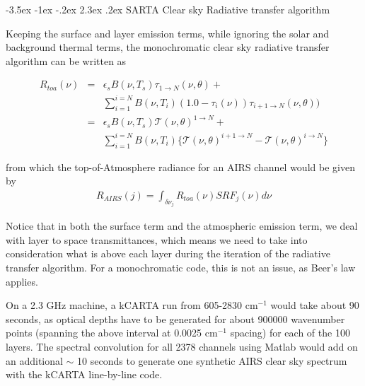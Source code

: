 \documentclass[11pt]{article}
\makeatletter
\newcommand{\kc}{\textsf{kCARTA}\xspace}
\newcommand{\wn}{cm$^{-1}$\xspace}
\renewcommand{\section}{\@startsection {section}{1}{\z@}%
                                   {-3.5ex \@plus -1ex \@minus -.2ex}%
                                   {2.3ex \@plus.2ex}%
                                   {\reset@font\large\bfseries}}
\makeatother
\begin{document}
\section{SARTA Clear sky Radiative transfer algorithm}

Keeping the surface and layer emission terms, while ignoring the solar and background thermal terms, 
the monochromatic clear sky radiative transfer algorithm can be written as

\begin{eqnarray*}
R_{toa}(\nu) & = & \epsilon_{s} B(\nu,T_{s}) \tau_{1 \rightarrow N}(\nu,\theta) + \\
             &   &  \sum_{i=1}^{i=N} B(\nu,T_{i})
                   (1.0 - \tau_{i}(\nu)) \tau_{i+1 \rightarrow N}(\nu,\theta)) \\
             & = & \epsilon_{s} B(\nu,T_{s}) \mathcal{T}(\nu,\theta)^{1 \rightarrow N} + \\
             &   &  \sum_{i=1}^{i=N} B(\nu,T_{i}) \{ \mathcal{T}(\nu,\theta)^{i+1\rightarrow N} - 
                                                     \mathcal{T}(\nu,\theta)^{i \rightarrow N} \}
\end{eqnarray*}

from which the top-of-Atmosphere radiance for an AIRS channel would be given by
\begin{eqnarray*}
  R_{AIRS}(j) = \int_{\delta \nu_{j}} R_{toa}(\nu) SRF_{j}(\nu) d\nu
\end{eqnarray*}

Notice that in both the surface term and the atmospheric emission term, we deal with layer to 
space transmittances, which means we need to take into consideration what is above each layer during 
the iteration of the radiative transfer algorithm. For a monochromatic code, this is not an issue, as 
Beer's law applies.

On a 2.3 GHz machine, a \kc run from 605-2830 \wn would take about 90 seconds, as optical depths have to be 
generated for about 900000 wavenumber points (spanning the above interval at 0.0025 \wn spacing) for each 
of the 100 layers. The spectral convolution for all 2378 channels using Matlab would add on an additional 
$\sim$ 10 seconds to generate one synthetic AIRS clear sky spectrum with the \kc line-by-line code.
\end{document}
